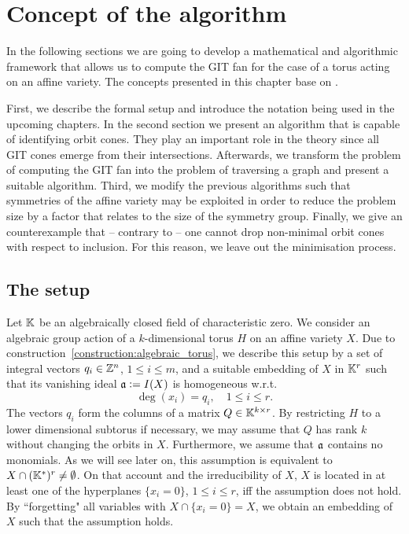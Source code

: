 



\label{algorithm:main}

\chapter{Concept of the algorithm}
\label{chap:algorithm}

In the following sections we are going to develop a mathematical and algorithmic framework that allows us to compute the GIT fan for the case of a torus acting on an affine variety. The concepts presented in this chapter base on \cite{gitfan_symmetry, gitfan}.

First, we describe the formal setup and introduce the notation being used in the upcoming chapters. In the second section we present an algorithm that is capable of identifying orbit cones. They play an important role in the theory since all GIT cones emerge from their intersections. Afterwards, we transform the problem of computing the GIT fan into the problem of traversing a graph and present a suitable algorithm. Third, we modify the previous algorithms such that symmetries of the affine variety may be exploited in order to reduce the problem size by a factor that relates to the size of the symmetry group. Finally, we give an counterexample that -- contrary to \cite{gitfan_symmetry} -- one cannot drop non-minimal orbit cones with respect to inclusion. For this reason, we leave out the minimisation process.

\section{The setup}
\label{section:setup}

Let $\mathbb{K}$ be an algebraically closed field of characteristic zero. We consider an algebraic group action of a $k$-dimensional torus $H$ on an affine variety $X$. Due to construction~\ref{construction:algebraic_torus}, we describe this setup by a set of integral vectors $q_i\in\mathbb{Z}^n$, $1\leq i \leq m$, and a suitable embedding of $X$ in $\mathbb{K}^r$ such that its vanishing ideal $\mathfrak{a} \mathrel{\mathop:}= I(X)$ is homogeneous w.r.t.
$$\deg(x_i) = q_i,\quad 1\leq i \leq r.$$
The vectors $q_i$ form the columns of a matrix $Q\in\mathbb{K}^{k\times r}$. By restricting $H$ to a lower dimensional subtorus if necessary, we may assume that $Q$ has rank $k$ without changing the orbits in $X$. Furthermore, we assume that $\mathfrak{a}$ contains no monomials. As we will see later on, this assumption is equivalent to $X\cap (\mathbb{K}^*)^r \neq \emptyset$. On that account and the irreducibility of $X$, $X$ is located in at least one of the hyperplanes $\{x_i = 0\}$, $1\leq i \leq r$, iff the assumption does not hold. By ``forgetting" all variables with $X\cap \{x_i = 0\} = X$, we obtain an embedding of $X$ such that the assumption holds.

